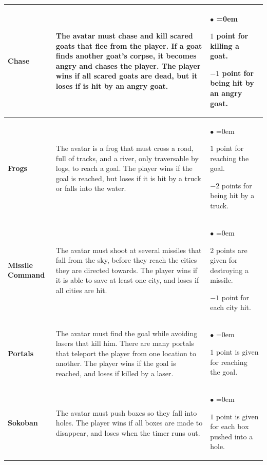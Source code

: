 \documentclass[conference]{IEEEtran}
\begin{document}
\begin{table}[!t]
\begin{center}
\begin{tabular}{|m{1.4cm}|m{8cm}|m{6cm}|}
\hline
\textbf{Chase} & The avatar must chase and kill scared goats that flee from the player. If a goat finds another goat's corpse, it becomes angry and chases the player. The player wins if all scared goats are dead, but it loses if is hit by an angry goat. & \begin{list}{$\bullet$}{\leftmargin=2pt \itemindent=0em} \item $1$ point for killing a goat. \item $-1$ point for being hit by an angry goat. \end{list} \\
\hline
\textbf{Frogs} & The avatar is a frog that must cross a road, full of tracks, and a river, only traversable by logs, to reach a goal.  The player wins if the goal is reached, but loses if it is hit by a truck or falls into the water. & \begin{list}{$\bullet$}{\leftmargin=2pt \itemindent=0em} \item $1$ point for reaching the goal. \item $-2$ points for being hit by a truck. \end{list} \\
\hline
\textbf{Missile Command} & The avatar must shoot at several missiles that fall from the sky, before they reach the cities they are directed towards. The player wins if it is able to save at least one city, and loses if all cities are hit. &  \begin{list}{$\bullet$}{\leftmargin=2pt \itemindent=0em} \item $2$ points are given for destroying a missile. \item $-1$ point for each city hit. \end{list} \\
\hline
\textbf{Portals} & The avatar must find the goal while avoiding lasers that kill him. There are many portals that teleport the player from one location to another. The player wins if the goal is reached, and loses if killed by a laser.& \begin{list}{$\bullet$}{\leftmargin=2pt \itemindent=0em} \item $1$ point is given for reaching the goal. \end{list} \\
\hline
\textbf{Sokoban} & The avatar must push boxes so they fall into holes. The player wins if all boxes are made to disappear, and loses when the timer runs out. & \begin{list}{$\bullet$}{\leftmargin=2pt \itemindent=0em} \item $1$ point is given for each box pushed into a hole. \end{list} \\

\end{tabular}
\end{center}
\end{table}
\end{document}
